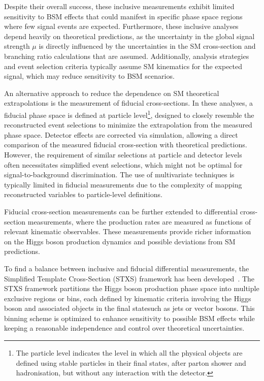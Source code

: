 \documentclass[11pt,twoside]{book}
\begin{document}
Despite their overall success, these inclusive measurements exhibit limited sensitivity to B\acrshort{SM} effects that could manifest in specific phase space regions where few signal events are expected. Furthermore, these inclusive analyses depend heavily on theoretical predictions, as the uncertainty in the global signal strength $\mu$ is directly influenced by the uncertainties in the \acrshort{SM} cross-section and branching ratio calculations that are assumed. Additionally, analysis strategies and event selection criteria typically assume \acrshort{SM} kinematics for the expected signal, which may reduce sensitivity to B\acrshort{SM} scenarios.

An alternative approach to reduce the dependence on \acrshort{SM} theoretical extrapolations is the measurement of fiducial cross-sections. In these analyses, a fiducial phase space is defined at particle level\footnote{The particle level indicates the level in which all the physical objects are defined using stable particles in their final states, after parton shower and hadronisation, but without any interaction with the detector.}, designed to closely resemble the reconstructed event selections to minimize the extrapolation from the measured phase space. Detector effects are corrected via simulation, allowing a direct comparison of the measured fiducial cross-section with theoretical predictions. However, the requirement of similar selections at particle and detector levels often necessitates simplified event selections, which might not be optimal for signal-to-background discrimination. The use of multivariate techniques is typically limited in fiducial measurements due to the complexity of mapping reconstructed variables to particle-level definitions.

Fiducial cross-section measurements can be further extended to differential cross-section measurements, where the production rates are measured as functions of relevant kinematic observables. These measurements provide richer information on the Higgs boson production dynamics and possible deviations from \acrshort{SM} predictions.

To find a balance between inclusive and fiducial differential measurements, the Simplified Template Cross-Section (STXS) framework has been developed~\cite{https://arxiv.org/abs/1605.04692}. The STXS framework partitions the Higgs boson production phase space into multiple exclusive regions or bins, each defined by kinematic criteria involving the Higgs boson and associated objects in the final statesuch as jets or vector bosons. This binning scheme is optimized to enhance sensitivity to possible B\acrshort{SM} effects while keeping a reasonable independence and control over theoretical uncertainties.
\end{document}
